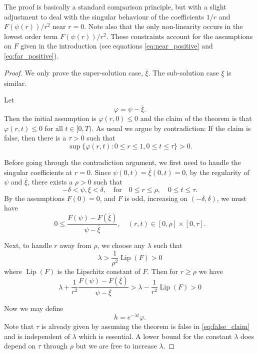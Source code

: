 \documentclass{amsart}
\begin{document}
The proof is basically a standard comparison principle, but with a slight adjustment to deal with the singular behaviour of the coefficients \(1/r\) and \(F(\psi(r))/r^2\) near \(r=0\). Note also that the only non-linearity occurs in the lowest order term \(F(\psi(r))/r^2\). These constraints account for the assumptions on \(F\) given in the introduction (see equations \eqref{eq:near_positive} and \eqref{eq:far_positive}).

\begin{proof}
We only prove the super-solution case, \(\overline{\xi}\). The sub-solution case \(\underline{\xi}\) is similar.

Let
\[
\varphi = \psi - \overline{\xi}.
\]
Then the initial assumption is \(\varphi(r, 0) \leq 0\) and the claim of the theorem is that \(\varphi(r, t) \leq 0\) for all \(t \in [0, T)\). As usual we argue by contradiction: If the claim is false, then there is a \(\tau > 0\) such that
\begin{equation}
\label{eq:false_claim}
\sup \{\varphi(r, t) : 0 \leq r \leq 1, 0 \leq t \leq \tau\} > 0.
\end{equation}

Before going through the contradiction argument, we first need to handle the singular coefficients at \(r = 0\). Since \(\psi(0, t) = \overline{\xi}(0, t) = 0\), by the regularity of \(\psi\) and \(\overline{\xi}\), there exists a \(\rho > 0\) such that
\[
-\delta < \psi, \xi < \delta, \quad \text{for} \quad 0 \leq r \leq \rho, \quad 0 \leq t \leq \tau.
\]
By the assumptions \(F(0) = 0\), and \(F\) is odd, increasing on \((-\delta,\delta)\), we must have
\begin{equation}
\label{eq:near_positive}
0 \leq \frac{F(\psi) - F(\overline{\xi})}{\psi - \overline{\xi}}, \quad (r, t) \in [0, \rho] \times [0, \tau].
\end{equation}

Next, to handle \(r\) away from \(\rho\), we choose any \(\lambda\) such that
\[
\lambda > \frac{1}{\rho^2} \operatorname{Lip} (F) > 0
\]
where \(\operatorname{Lip} (F)\) is the Lipschitz constant of \(F\). Then for  \(r \geq \rho\) we have
\begin{equation}
\label{eq:far_positive}
\lambda + \frac{1}{r^2} \frac{F(\psi) - F(\overline{\xi})}{\psi - \overline{\xi}} > \lambda - \frac{1}{r^2} \operatorname{Lip} (F) > 0
\end{equation}

Now we may define
\[
h = e^{-\lambda t} \varphi.
\]
Note that \(\tau\) is already given by assuming the theorem is false in \eqref{eq:false_claim} and is independent of \(\lambda\) which is essential. A lower bound for the constant \(\lambda\) does depend on \(\tau\) through \(\rho\) but we are free to increase \(\lambda\).


\end{proof}
\end{document}
